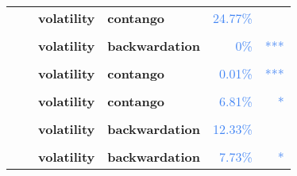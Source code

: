 \documentclass[
  authoryear,
  preprint,
  3p]{elsarticle}
\begin{document}
\begin{longtable}[t]{>{}l>{}l>{}l>{}l>{}r>{}r}
\addlinespace
\textbf{} & \textbf{} & \textbf{volatility} & \textbf{contango} & \textcolor[HTML]{4285f4}{24.77\%} & \textcolor[HTML]{4285f4}{}\\
\textbf{\cellcolor{gray!10}{}} & \textbf{\cellcolor{gray!10}{financialisation}} & \textbf{\cellcolor{gray!10}{mean}} & \textbf{\cellcolor{gray!10}{backwardation}} & \textcolor[HTML]{4285f4}{\cellcolor{gray!10}{55.51\%}} & \textcolor[HTML]{4285f4}{\cellcolor{gray!10}{}}\\
\textbf{} & \textbf{} & \textbf{volatility} & \textbf{backwardation} & \textcolor[HTML]{4285f4}{0\%} & \textcolor[HTML]{4285f4}{\vphantom{3} ***}\\
\textbf{\cellcolor{gray!10}{}} & \textbf{\cellcolor{gray!10}{crisis}} & \textbf{\cellcolor{gray!10}{mean}} & \textbf{\cellcolor{gray!10}{backwardation}} & \textcolor[HTML]{4285f4}{\cellcolor{gray!10}{68.46\%}} & \textcolor[HTML]{4285f4}{\cellcolor{gray!10}{}}\\
\textbf{} & \textbf{} & \textbf{volatility} & \textbf{contango} & \textcolor[HTML]{4285f4}{0.01\%} & \textcolor[HTML]{4285f4}{\vphantom{1} ***}\\
\addlinespace
\textbf{\cellcolor{gray!10}{}} & \textbf{\cellcolor{gray!10}{post-crisis}} & \textbf{\cellcolor{gray!10}{mean}} & \textbf{\cellcolor{gray!10}{backwardation}} & \textcolor[HTML]{4285f4}{\cellcolor{gray!10}{21.55\%}} & \textcolor[HTML]{4285f4}{\cellcolor{gray!10}{}}\\
\textbf{} & \textbf{} & \textbf{volatility} & \textbf{contango} & \textcolor[HTML]{4285f4}{6.81\%} & \textcolor[HTML]{4285f4}{*}\\
\textbf{\cellcolor{gray!10}{Cocoa (IFUS)}} & \textbf{\cellcolor{gray!10}{past}} & \textbf{\cellcolor{gray!10}{mean}} & \textbf{\cellcolor{gray!10}{contango}} & \textcolor[HTML]{4285f4}{\cellcolor{gray!10}{99.36\%}} & \textcolor[HTML]{4285f4}{\cellcolor{gray!10}{}}\\
\textbf{} & \textbf{} & \textbf{volatility} & \textbf{backwardation} & \textcolor[HTML]{4285f4}{12.33\%} & \textcolor[HTML]{4285f4}{}\\
\textbf{\cellcolor{gray!10}{}} & \textbf{\cellcolor{gray!10}{financialisation}} & \textbf{\cellcolor{gray!10}{mean}} & \textbf{\cellcolor{gray!10}{contango}} & \textcolor[HTML]{4285f4}{\cellcolor{gray!10}{59.85\%}} & \textcolor[HTML]{4285f4}{\cellcolor{gray!10}{}}\\
\addlinespace
\textbf{} & \textbf{} & \textbf{volatility} & \textbf{backwardation} & \textcolor[HTML]{4285f4}{7.73\%} & \textcolor[HTML]{4285f4}{*}\\

\end{longtable}
\end{document}
